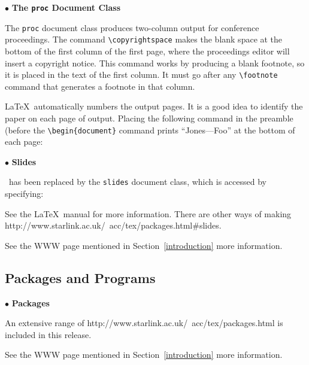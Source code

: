 \documentclass[11pt,twoside,nolof]{starlink}
\begin{document}
$\bullet$ \textbf{The \texttt{proc} Document Class}

The \texttt{proc} document class produces two-column output for conference
proceedings.  The command \hbox{\verb|\copyrightspace|} makes the blank
space at the bottom of the first column of the first page, where the
proceedings editor will insert a copyright notice.  This command works
by producing a blank footnote, so it is placed in the text of the first
column.  It must go after any \hbox{\verb|\footnote|} command that
generates a footnote in that column.

\LaTeX\ automatically numbers the output pages.  It is a good idea
to identify the paper on each page of output.  Placing the following command
in the preamble (before the \hbox{\verb|\begin{document}|} command
prints ``Jones---Foo'' at the bottom of each page:

\begin{terminalv}
\end{terminalv}

$\bullet$ \textbf{Slides}

\SLITeX\ has been replaced by the \texttt{slides} document class,
which is accessed by specifying:


See the \LaTeX\ manual\cite{lamport} for more information.
There are other ways of making
{http://www.starlink.ac.uk/~acc/tex/packages.html\#slides}.
\begin{latexonly} See the
WWW page mentioned in Section~\ref{introduction} more information.
\end{latexonly}

\subsection{Packages and Programs}

$\bullet$ \textbf{Packages}

An extensive range of
{http://www.starlink.ac.uk/~acc/tex/packages.html}
is included in this release.
\begin{latexonly} See the
WWW page mentioned in Section~\ref{introduction} more information.
\end{latexonly}
\end{document}
